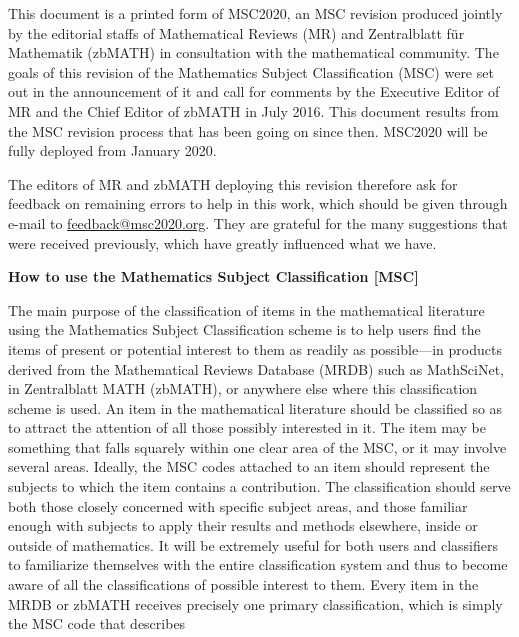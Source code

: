 \documentclass[letterpaper]{article}
\begin{document}
\begin{doublespace}
This  document  is  a  printed  form  of  MSC2020,  an  MSC  revision  produced
jointly by the editorial staffs of Mathematical Reviews (MR) and Zentralblatt 
f\"{u}r Mathematik (zbMATH) in consultation with the mathematical community. 
The goals of
this revision of the Mathematics Subject Classification (MSC) were set out in 
the
announcement of it and call for comments by the Executive Editor of MR and the
Chief Editor of zbMATH in July 2016. This document results from the MSC 
revision
process that has been going on since then. MSC2020 will be fully deployed from
January 2020.
\par
The editors of MR and zbMATH deploying this revision therefore ask for feedback 
on
remaining errors to help in this work, which should be given through e-mail to
\href{mailto:feedback@msc2020.org}{feedback@msc2020.org}. They are grateful for the many suggestions that were received previously, which have greatly influenced what we have.
\newpage
\begin{center}\textbf{\Large{How to use the
Mathematics Subject Classification [MSC]}}\end{center}
The main purpose of the classification of items in the mathematical literature
using  the  Mathematics  Subject  Classification  scheme  is  to  help  users  
find  the
items of present or potential interest to them as readily as possible—in 
products
derived from the Mathematical Reviews Database (MRDB) such as MathSciNet, in
Zentralblatt MATH (zbMATH), or anywhere else where this classification scheme is
used. An item in the mathematical literature should be classified so as to 
attract the
attention of all those possibly interested in it. The item may be something 
that
falls  squarely  within  one  clear  area  of  the  MSC,  or  it  may  involve  
several  areas.
Ideally, the MSC codes attached to an item should represent the subjects to 
which
the item contains a contribution. The classification should serve both those 
closely
concerned with specific subject areas, and those familiar enough with subjects 
to
apply their results and methods elsewhere, inside or outside of mathematics. It 
will
be extremely useful for both users and classifiers to familiarize themselves 
with the
entire  classification  system  and  thus  to  become  aware  of  all  the  
classifications  of
possible interest to them.
Every   item   in   the   MRDB   or   zbMATH   receives   precisely   one
primary
classification,   which   is   simply   the   MSC   code   that   describes   

\end{doublespace}
\end{document}
